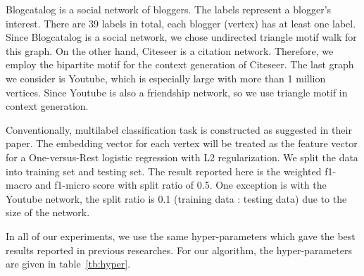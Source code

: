 \documentclass[letterpaper]{article}
\begin{document}
            Blogcatalog \cite{blogcatalog} is a social network of bloggers. The labels represent
            a blogger's interest. There are 39 labels in total, each blogger (vertex) has at least
            one label. Since Blogcatalog is a social network, we chose undirected triangle motif
            walk for this graph. On the other hand, Citeseer \cite{planetoid} 
            is a citation network. Therefore, we employ the bipartite motif for the context generation
            of Citeseer. The last graph we consider is Youtube, which is especially
            large with more than 1 million vertices. Since Youtube is also a friendship network,
            so we use triangle motif in context generation.

            Conventionally, multilabel classification task is constructed as \cite{deepwalk} suggested
            in their paper. The embedding vector for each vertex will be treated as the feature
            vector for a One-versus-Rest logistic regression with L2 regularization. We split the 
            data into training set and testing set. The result reported here is the weighted f1-macro and
            f1-micro score with split ratio of 0.5. One exception is with the Youtube network, the
            split ratio is 0.1 (training data : testing data) due to the size of the network.

            In all of our experiments, we use the same hyper-parameters which gave the best 
            results reported in previous researches. For our algorithm, the hyper-parameters
            are given in table~\ref{tb:hyper}.

            \begin{table}
                \centering
                \label{tb:hyper}
                \caption{MAGE Hyper-parameters}
            \end{table}
\end{document}
